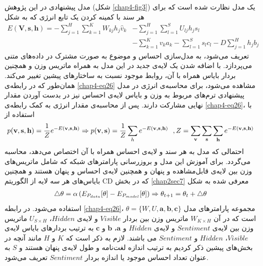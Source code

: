 مدل پیشنهادی در این پژوهش 
(شکل \ref{chap4-fig3})
 یک مدل نظارت شده است که برای هر سند با کمینه کردن یک تابع انرژی که به شکل
\begin{align}
	\label{chap4-eq26}
	E(\textbf{V},\textbf{s},\textbf{h})=-\sum_{j=1}^{H}\sum_{k=1}^{K}W_{kj}h_j\hat{v}_{k}&-\sum_{j=1}^{H}\sum_{l=1}^{S}U_{lj}h_js_l\\\nonumber
	&-\sum_{k=1}^{K}v_{k}a_{k} -\sum_{l=1}^{S}s_lc_l- D\sum_{j=1}^{H}h_jb_j
\end{align}
تعریف می‌‌شود، به مدل‌سازی احساس و موضوع به صورت مشترک در داده‌های متنی می‌‌پردازد. با اضافه شدن یک لایه‌ی جدید در این مدل به همراه ماتریس وزن و همچنین بردار بایاس همراه با آن، روابط موجود نسبت به ساختار‌های پیشین تغییر می‌کند. همان‌طور که در رابطه‌ی
\ref{chap4-eq26}
مشاهده می‌‌شود، برای محاسبه‌ی انرژی در مدل پیشنهادی ترم‌های مربوط به وزن و بایاس لایه‌ی احساس نیز در بدست آوردن مقدار نهایی مشارکت دارند. پس از محاسبه‌ی مقدار انرژی به کمک رابطه‌ی
\ref{chap4-eq26}،
 با استفاده از
\begin{align}
	\centering
	\label{chap4-eq27}
	p(\textbf{v},\textbf{s},\textbf{h}) = \dfrac{1}{Z} e^{-E(\textbf{v},\textbf{s},\textbf{h})} \Rightarrow
	p(\textbf{v},\textbf{s}) = \dfrac{1}{Z} \sum_{h}  e^{-E(\textbf{v},\textbf{s},\textbf{h})} \ \ ,
	Z = \sum_{\textbf{v}}\sum_{\textbf{s}}\sum_{\textbf{h}} e^{-E(\textbf{v},\textbf{s},\textbf{h})} 
\end{align}
احتمالی‌ که مدل به هر سند و ‌لایه‌ی احساس همراه با آن اختصاص می‌‌دهد، محاسبه می‌‌گردد. برای آموزش این مدل و بروزرسانی پارامترهای شبکه که شامل ماتریس‌های وزن بین لایه‌ی قابل‌مشاهده و پنهان و همچنین لایه‌ی احساس و پنهان هستند و همچنین بایاس‌های هر سه‌ لایه از الگوریتم
CD
که در بخش
\ref{chap2sec7}
معرفی‌ شده به شکل
\begin{align}
	\centering
	\label{chap4-eq28}
	\triangle\theta = \alpha \left( E_{P_{data}}[\theta]-E_{P_{model}}[\theta]\right) \Rightarrow \theta_{t+1} = \theta_t + \triangle\theta
\end{align}
استفاده می‌‌شود.
در رابطه
\ref{chap4-eq26}، $\theta=\{W, U, \textbf{a}, \textbf{b}, \textbf{c} \}$
مجموعه پارامتر‌های مدل است که در آن
$W_{K \times H}$
ماتریس وزن بین بردار
$Visible$
و لایه‌ی
$Hidden$، $U_{S \times H}$
ماتریس وزن بین لایه‌ی
$Sentiment$
و لایه‌ی
$Hidden$
و
$\textbf{a}$، $\textbf{b}$
و
$\textbf{c}$
به ترتیب بردار‌های بایاس لایه‌ی
$Visible$، $Hidden$
و
$Sentiment$
می‌ باشند. لازم به ذکر است که
$K$
و
$H$
مانند آنچه در بخش‌های پیشین ذکر کردیم به ترتیب اندازه لغت‌نامه و طول لایه‌ی پنهان هستند و
$S$
به عنوان تعداد احساس موجود یا اندازه بردار
$Sentiment$
تعریف می‌‌شود.

